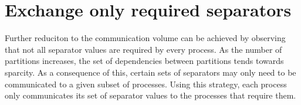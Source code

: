 



\section{Exchange only required separators}
Further reduciton to the communication volume can be achieved by observing that not all separator values are required by every process. As the number of partitions increases, the set of dependencies between partitions tends towards sparcity. As a consequence of this, certain sets of separators may only need to be communicated to a given subset of processes. Using this strategy, each process only communicates its set of separator values to the processes that require them.




